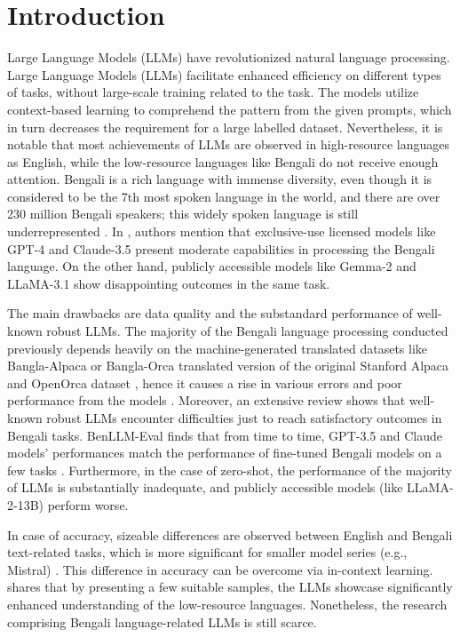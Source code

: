 \documentclass[10pt,letterpaper]{article}
\begin{document}
\linenumbers

\section*{Introduction}
Large Language Models (LLMs) have revolutionized natural language processing. Large Language Models (LLMs) facilitate enhanced efficiency on different types of tasks, without large-scale training related to the task. The models utilize context-based learning to comprehend the pattern from the given prompts, which in turn decreases the requirement for a large labelled dataset. Nevertheless, it is notable that most achievements of LLMs are observed in high-resource languages as English, while the low-resource languages like Bengali do not receive enough attention. Bengali is a rich language with immense diversity, even though it is considered to be the 7th most spoken language in the world, and there are over 230 million Bengali speakers; this widely spoken language is still underrepresented \cite{b45}. In \cite{b10,b29}, authors mention that exclusive-use licensed models like GPT-4 and Claude-3.5 present moderate capabilities in processing the Bengali language. On the other hand, publicly accessible models like Gemma-2 and LLaMA-3.1 show disappointing outcomes in the same task.

The main drawbacks are data quality and the substandard performance of well-known robust LLMs. The majority of the Bengali language processing conducted previously depends heavily on the machine-generated translated datasets like Bangla-Alpaca or Bangla-Orca translated version of the original Stanford Alpaca and OpenOrca dataset \cite{b48}, hence it causes a rise in various errors and poor performance from the models \cite{b28}. Moreover, an extensive review shows that well-known robust LLMs encounter difficulties just to reach satisfactory outcomes in Bengali tasks. BenLLM-Eval finds that from time to time, GPT-3.5 and Claude models’ performances match the performance of fine-tuned Bengali models on a few tasks \cite{b3}. Furthermore, in the case of zero-shot, the performance of the majority of LLMs is substantially inadequate, and publicly accessible models (like LLaMA-2-13B) perform worse.

In case of accuracy, sizeable differences are observed between English and Bengali text-related tasks, which is more significant for smaller model series (e.g., Mistral) \cite{b6}. This difference in accuracy can be overcome via in-context learning. \cite{b43} shares that by presenting a few suitable samples, the LLMs showcase significantly enhanced understanding of the low-resource languages. Nonetheless, the research comprising Bengali language-related LLMs is still scarce.
\end{document}
